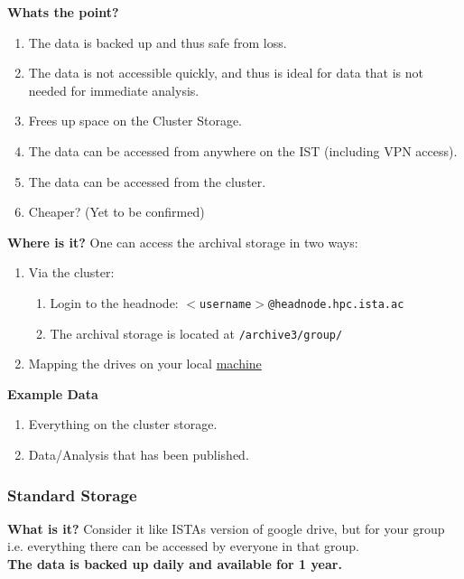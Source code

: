 \documentclass{article}
\begin{document}
\noindent
\textbf{Whats the point?}
\newline
\begin{enumerate}
    \item The data is backed up and thus safe from loss.
    \item The data is not accessible quickly, and thus is ideal for data that is not needed for immediate analysis.
    \item Frees up space on the Cluster Storage.
    \item The data can be accessed from anywhere on the IST  (including VPN access).
    \item The data can be accessed from the cluster.
    \item Cheaper? (Yet to be confirmed)
\end{enumerate}

\noindent
\textbf{Where is it?}
\newline
One can access the archival storage in two ways:
\begin{enumerate}
    \item Via the cluster: 
    \begin{enumerate}
        \item Login to the headnode: \texttt{$<$username$>$@headnode.hpc.ista.ac}
        \item The archival storage is located at \texttt{/archive3/group/}
    \end{enumerate}
    \item Mapping the drives on your local \href{https://it.pages.ist.ac.at/docs/it-documentation/fileservers/fileshare/}{machine}
\end{enumerate}

\noindent
\textbf{Example Data}
\begin{enumerate}
    \item Everything on the cluster storage.
    \item Data/Analysis that has been published.
\end{enumerate}

\subsubsection{Standard Storage}
\textbf{What is it?}
\newline
Consider it like ISTAs version of google drive, but for your group i.e. everything there can be accessed by everyone in that group.
\\
\textbf{The data is backed up daily and available for 1 year.}
\\
\end{document}
